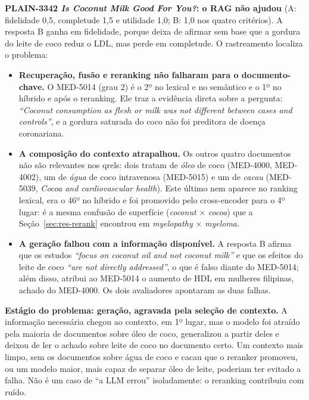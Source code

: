 \documentclass[10pt,a4paper]{article}
\newcommand{\med}[1]{\mbox{MED-#1}}         %
\newcommand{\pq}[1]{\mbox{PLAIN-#1}}        %
\begin{document}
\textbf{\pq{3342} \emph{Is Coconut Milk Good For You?}: o RAG não ajudou} (A: fidelidade 0,5, completude 1,5 e utilidade 1,0; B: 1,0 nos quatro critérios). A resposta B ganha em fidelidade, porque deixa de afirmar sem base que a gordura do leite de coco reduz o LDL, mas perde em completude. O rastreamento localiza o problema:
\begin{itemize}
\item \textbf{Recuperação, fusão e reranking não falharam para o documento-chave.} O \med{5014} (grau 2) é o 2º no lexical e no semântico e o 1º no híbrido e após o reranking. Ele traz a evidência direta sobre a pergunta: \emph{``Coconut consumption as flesh or milk was not different between cases and controls''}, e a gordura saturada do coco não foi preditora de doença coronariana.
\item \textbf{A composição do contexto atrapalhou.} Os outros quatro documentos não são relevantes nos qrels: dois tratam de \emph{óleo} de coco (\med{4000}, \med{4002}), um de \emph{água} de coco intravenosa (\med{5015}) e um de \emph{cacau} (\med{5039}, \emph{Cocoa and cardiovascular health}). Este último nem aparece no ranking lexical, era o 46º no híbrido e foi promovido pelo cross-encoder para o 4º lugar: é a mesma confusão de superfície (\emph{coconut} $\times$ \emph{cocoa}) que a Seção~\ref{sec:res-rerank} encontrou em \emph{myelopathy} $\times$ \emph{myeloma}.
\item \textbf{A geração falhou com a informação disponível.} A resposta B afirma que os estudos \emph{``focus on coconut oil and not coconut milk''} e que os efeitos do leite de coco \emph{``are not directly addressed''}, o que é falso diante do \med{5014}; além disso, atribui ao \med{5014} o aumento de HDL em mulheres filipinas, achado do \med{4000}. Os dois avaliadores apontaram as duas falhas.
\end{itemize}
\textbf{Estágio do problema: geração, agravada pela seleção de contexto.} A informação necessária chegou ao contexto, em 1º lugar, mas o modelo foi atraído pela maioria de documentos sobre óleo de coco, generalizou a partir deles e deixou de ler o achado sobre leite de coco no documento certo. Um contexto mais limpo, sem os documentos sobre água de coco e cacau que o reranker promoveu, ou um modelo maior, mais capaz de separar óleo de leite, poderiam ter evitado a falha. Não é um caso de ``a LLM errou'' isoladamente: o reranking contribuiu com ruído.
\end{document}
